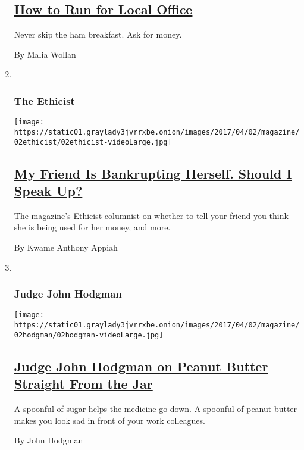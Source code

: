 \begin{enumerate}
{  \subsection{\texorpdfstring{\href{/2017/03/31/magazine/how-to-run-for-local-office.html}{How
  to Run for Local
  Office}}{How to Run for Local Office}}\label{how-to-run-for-local-office}}

  Never skip the ham breakfast. Ask for money.

  By Malia Wollan
\item ~
  \hypertarget{the-ethicist}{%
  \subsubsection{The Ethicist}\label{the-ethicist}}

  \texttt{[image: https://static01.graylady3jvrrxbe.onion/images/2017/04/02/magazine/02ethicist/02ethicist-videoLarge.jpg]}

  \hypertarget{my-friend-is-bankrupting-herself-should-i-speak-up}{%
  \subsection{\texorpdfstring{\href{/2017/03/29/magazine/my-friend-is-bankrupting-herself-should-i-speak-up.html}{My
  Friend Is Bankrupting Herself. Should I Speak
  Up?}}{My Friend Is Bankrupting Herself. Should I Speak Up?}}\label{my-friend-is-bankrupting-herself-should-i-speak-up}}

  The magazine's Ethicist columnist on whether to tell your friend you
  think she is being used for her money, and more.

  By Kwame Anthony Appiah
\item ~
  \hypertarget{judge-john-hodgman}{%
  \subsubsection{Judge John Hodgman}\label{judge-john-hodgman}}

  \texttt{[image: https://static01.graylady3jvrrxbe.onion/images/2017/04/02/magazine/02hodgman/02hodgman-videoLarge.jpg]}

  \hypertarget{judge-john-hodgman-on-peanut-butter-straight-from-the-jar}{%
  \subsection{\texorpdfstring{\href{/2017/03/31/magazine/judge-john-hodgman-on-peanut-butter-straight-from-the-jar.html}{Judge
  John Hodgman on Peanut Butter Straight From the
  Jar}}{Judge John Hodgman on Peanut Butter Straight From the Jar}}\label{judge-john-hodgman-on-peanut-butter-straight-from-the-jar}}

  A spoonful of sugar helps the medicine go down. A spoonful of peanut
  butter makes you look sad in front of your work colleagues.

  By John Hodgman
\end{enumerate}


